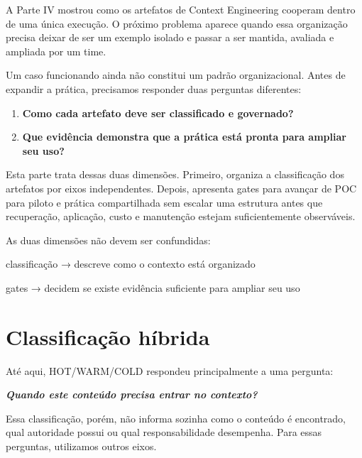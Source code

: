 \documentclass[
  10pt,
  a4paper,
  oneside]{book}
\newenvironment{Shaded}{}{}
\newcommand{\NormalTok}[1]{#1}
\providecommand{\tightlist}{%
  \setlength{\itemsep}{0pt}\setlength{\parskip}{0pt}}
\renewenvironment{quote}
  {\def\FrameCommand{\fboxsep=10pt\colorbox{LightBlue}}%
   \MakeFramed{\advance\hsize-\width\FrameRestore}\itshape}
  {\endMakeFramed}
\renewenvironment{Shaded}{\begin{snugshade}}{\end{snugshade}}%
\begin{document}
A Parte IV mostrou como os artefatos de Context Engineering cooperam
dentro de uma única execução. O próximo problema aparece quando essa
organização precisa deixar de ser um exemplo isolado e passar a ser
mantida, avaliada e ampliada por um time.

Um caso funcionando ainda não constitui um padrão organizacional. Antes
de expandir a prática, precisamos responder duas perguntas diferentes:

\begin{enumerate}
\def\labelenumi{\arabic{enumi}.}
\tightlist
\item
  \textbf{Como cada artefato deve ser classificado e governado?}
\item
  \textbf{Que evidência demonstra que a prática está pronta para ampliar
  seu uso?}
\end{enumerate}

Esta parte trata dessas duas dimensões. Primeiro, organiza a
classificação dos artefatos por eixos independentes. Depois, apresenta
gates para avançar de POC para piloto e prática compartilhada sem
escalar uma estrutura antes que recuperação, aplicação, custo e
manutenção estejam suficientemente observáveis.

As duas dimensões não devem ser confundidas:

\begin{Shaded}
\begin{Highlighting}[]
\NormalTok{classificação}
\NormalTok{→ descreve como o contexto está organizado}

\NormalTok{gates}
\NormalTok{→ decidem se existe evidência suficiente para ampliar seu uso}
\end{Highlighting}
\end{Shaded}

\hypertarget{classificauxe7uxe3o-huxedbrida}{%
\section{Classificação híbrida}\label{classificauxe7uxe3o-huxedbrida}}

Até aqui, HOT/WARM/COLD respondeu principalmente a uma pergunta:

\begin{quote}
\textbf{Quando este conteúdo precisa entrar no contexto?}
\end{quote}

Essa classificação, porém, não informa sozinha como o conteúdo é
encontrado, qual autoridade possui ou qual responsabilidade desempenha.
Para essas perguntas, utilizamos outros eixos.
\end{document}
